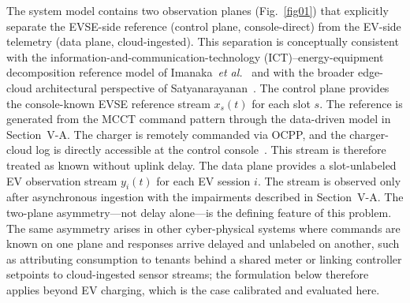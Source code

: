 \documentclass{ieeeaccess}
\newif\ifhighlight \highlightfalse
\DeclareRobustCommand{\revised}[1]{\ifhighlight{\color{blue}#1}\else{\color{.}#1}\fi}
\begin{document}
    The system model contains two observation planes (Fig.~\ref{fig01}) that explicitly separate the EVSE-side reference (control plane, console-direct) from the EV-side telemetry (data plane, cloud-ingested).
    This separation is conceptually consistent with the information-and-communication-technology (ICT)--energy-equipment decomposition reference model of Imanaka~\textit{et al.}~\cite{bimanaka23} and with the broader edge-cloud architectural perspective of Satyanarayanan~\cite{bsatya}.
    The control plane provides the console-known EVSE reference stream $x_s(t)$ for each slot $s$.
    The reference is generated from the MCCT command pattern through the data-driven model in Section~V-A.
    The charger is remotely commanded via OCPP, and the charger-cloud log is directly accessible at the control console~\cite{b14}.
    This stream is therefore treated as known without uplink delay.
    The data plane provides \revised{a slot-unlabeled} EV observation stream $y_i(t)$ for each EV session $i$.
    The stream is observed only after asynchronous ingestion with the impairments described in Section~V-A.
    The two-plane asymmetry---not delay alone---is the defining feature of this problem.
    \revised{The same asymmetry arises in other cyber-physical systems where commands are known on one plane and responses arrive delayed and unlabeled on another, such as attributing consumption to tenants behind a shared meter or linking controller setpoints to cloud-ingested sensor streams; the formulation below therefore applies beyond EV charging, which is the case calibrated and evaluated here.}
\end{document}
